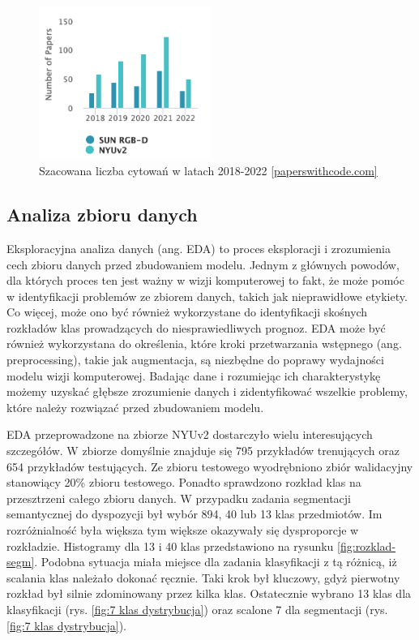 \begin{figure}[ht!]
    \centering
    \includegraphics[width=0.5\textwidth]{img/stats-dataset.png}
    \caption[]{Szacowana liczba cytowań w latach 2018-2022 \href{https://paperswithcode.com/dataset/sun-rgb-d}{[paperswithcode.com]}}
    \label{fig:sun-vs-nyu}
\end{figure}

\subsection{Analiza zbioru danych}
Eksploracyjna analiza danych (ang. EDA) to proces eksploracji i zrozumienia cech zbioru danych przed zbudowaniem modelu. Jednym z głównych powodów, dla których proces ten jest ważny w wizji komputerowej to fakt, że może pomóc w identyfikacji problemów ze zbiorem danych, takich jak nieprawidłowe etykiety. Co więcej, może ono być również wykorzystane do identyfikacji skośnych rozkładów klas prowadzących do niesprawiedliwych prognoz. EDA może być również wykorzystana do określenia, które kroki przetwarzania wstępnego (ang. preprocessing), takie jak augmentacja, są niezbędne do poprawy wydajności modelu wizji komputerowej. Badając dane i rozumiejąc ich charakterystykę możemy uzyskać głębsze zrozumienie danych i zidentyfikować wszelkie problemy, które należy rozwiązać przed zbudowaniem modelu.

EDA przeprowadzone na zbiorze NYUv2 dostarczyło wielu interesujących szczegółów. W zbiorze domyślnie znajduje się 795 przykładów trenujących oraz 654 przykładów testujących. Ze zbioru testowego wyodrębniono zbiór walidacyjny stanowiący 20\% zbioru testowego. Ponadto sprawdzono rozkład klas na przesztrzeni całego zbioru danych.
W przypadku zadania segmentacji semantycznej do dyspozycji był wybór 894, 40 lub 13 klas przedmiotów. Im rozróżnialność była większa tym większe okazywały się dysproporcje w rozkładzie. Histogramy dla 13 i 40 klas przedstawiono na rysunku \ref{fig:rozklad-segm}.
Podobna sytuacja miała miejsce dla zadania klasyfikacji z tą różnicą, iż scalania klas należało dokonać ręcznie. Taki krok był kluczowy, gdyż pierwotny rozkład był silnie zdominowany przez kilka klas.
Ostatecznie wybrano 13 klas dla klasyfikacji (rys. \ref{fig:7 klas dystrybucja}) oraz scalone 7 dla segmentacji (rys. \ref{fig:7 klas dystrybucja}).


